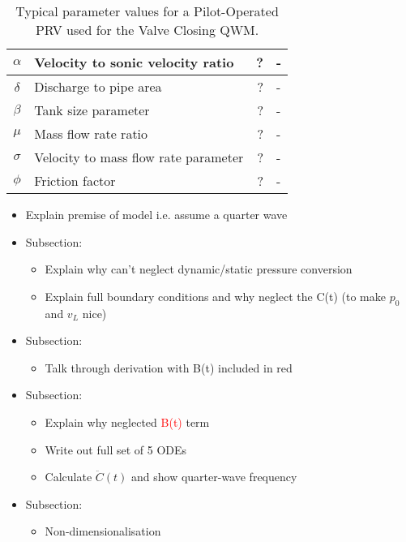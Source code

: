 \begin{table}[ht]
\begin{tabular}{c|l|r|l}
        $\alpha$ & Velocity to sonic velocity ratio & ? & - \\ \hline
        $\delta$ & Discharge to pipe area & ? & - \\ \hline
        $\beta$ & Tank size parameter & ? & - \\ \hline
        $\mu$ & Mass flow rate ratio & ? & - \\ \hline
        $\sigma$ & Velocity to mass flow rate parameter & ? & - \\ \hline
        $\phi$ & Friction factor & ? & - \\
    \end{tabular}
    \caption{Typical parameter values for a Pilot-Operated PRV used for the Valve Closing QWM.}
    \label{tab: ValveClosingQWMParameterValues}
\end{table}

\newpage
\begin{itemize}
    \item Explain premise of model i.e. assume a quarter wave
    \item Subsection:
    \begin{itemize}
    \item Explain why can't neglect dynamic/static pressure conversion
    \item Explain full boundary conditions and why neglect the C(t) (to make $p_0$ and $v_L$ nice)
    \end{itemize}
    \item Subsection:
    \begin{itemize}
    \item Talk through derivation with B(t) included in red
    \end{itemize}
    \item Subsection:
    \begin{itemize}
    \item Explain why neglected \textcolor{Red}{B(t)} term
    \item Write out full set of 5 ODEs
    \item Calculate $\ddot{C}(t)$ and show quarter-wave frequency
    \end{itemize}
    \item Subsection:
    \begin{itemize}
    \item Non-dimensionalisation
    \end{itemize}
\end{itemize}

\newpage
